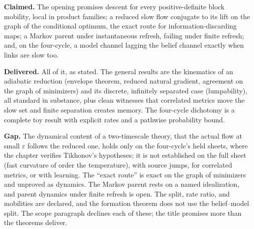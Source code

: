 \begin{verdictbox}{\NARROWER}
\textbf{Claimed.} The opening promises descent for every positive-definite block mobility, local in
product families; a reduced slow flow conjugate to its lift on the graph of the conditional optimum,
the exact route for information-discarding maps; a Markov parent under instantaneous refresh, failing
under finite refresh; and, on the four-cycle, a model channel lagging the belief channel exactly when
links are slow too.

\textbf{Delivered.} All of it, as stated. The general results are the kinematics of an adiabatic
reduction (envelope theorem, reduced natural gradient, agreement on the graph of minimizers) and its
discrete, infinitely separated case (lumpability), all standard in substance, plus clean witnesses
that correlated metrics move the slow set and finite separation creates memory. The four-cycle
dichotomy is a complete toy result with explicit rates and a pathwise probability bound.

\textbf{Gap.} The dynamical content of a two-timescale theory, that the actual flow at small
$\varepsilon$ follows the reduced one, holds only on the four-cycle's held sheets, where the chapter
verifies Tikhonov's hypotheses; it is not established on the full sheet (fast curvature of order the
temperature), with source jumps, for correlated metrics, or with learning. The ``exact route'' is exact
on the graph of minimizers and unproved as dynamics. The Markov parent rests on a named idealization,
and parent dynamics under finite refresh is open. The split, rate ratio, and mobilities are declared,
and the formation theorem does not use the belief--model split. The scope paragraph declines each of
these; the title promises more than the theorems deliver.
\end{verdictbox}
